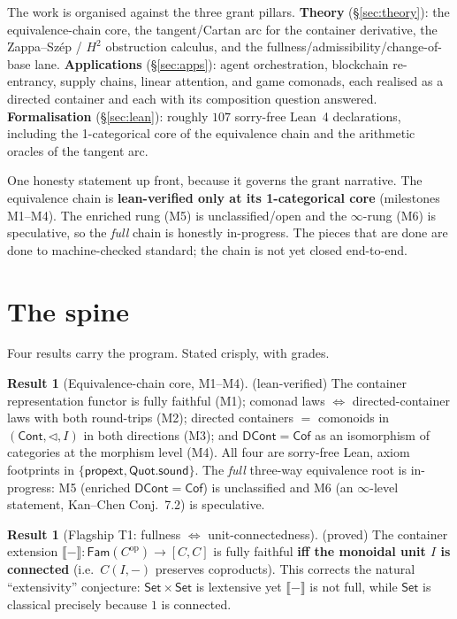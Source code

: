 \documentclass[11pt]{article}
\theoremstyle{definition}
\newtheorem{result}[theorem]{Result}
\newcommand{\Cont}{\mathsf{Cont}}
\newcommand{\DCont}{\mathsf{DCont}}
\newcommand{\Cof}{\mathsf{Cof}}
\newcommand{\Set}{\mathsf{Set}}
\newcommand{\Fam}{\mathsf{Fam}}
\newcommand{\sem}[1]{\llbracket #1 \rrbracket}
\newcommand{\grade}[1]{{\small\textsf{(#1)}}}
\begin{document}
The work is organised against the three grant pillars.
\textbf{Theory} (\S\ref{sec:theory}): the equivalence-chain core, the tangent/Cartan arc for
the container derivative, the Zappa--Szép / $H^2$ obstruction calculus, and the
fullness/admissibility/change-of-base lane. \textbf{Applications} (\S\ref{sec:apps}): agent
orchestration, blockchain re-entrancy, supply chains, linear attention, and game comonads, each
realised as a directed container and each with its composition question answered.
\textbf{Formalisation} (\S\ref{sec:lean}): roughly $107$ sorry-free Lean~4 declarations,
including the 1-categorical core of the equivalence chain and the arithmetic oracles of the
tangent arc.

One honesty statement up front, because it governs the grant narrative. The equivalence chain
is \textbf{lean-verified only at its 1-categorical core} (milestones M1--M4). The enriched rung
(M5) is unclassified/open and the $\infty$-rung (M6) is speculative, so the \emph{full} chain
is honestly \textsf{in-progress}. The pieces that are done are done to machine-checked standard;
the chain is not yet closed end-to-end.

\section{The spine}
\label{sec:spine}

Four results carry the program. Stated crisply, with grades.

\begin{result}[Equivalence-chain core, M1--M4]\grade{lean-verified}
\label{res:chain}
The container representation functor is fully faithful (M1); comonad laws $\Leftrightarrow$
directed-container laws with both round-trips (M2); directed containers $=$ comonoids in
$(\Cont,\lhd,I)$ in both directions (M3); and $\DCont = \Cof$ as an isomorphism of categories
at the morphism level (M4). All four are sorry-free Lean, axiom footprints in
$\{\textsf{propext},\textsf{Quot.sound}\}$. The \emph{full} three-way equivalence root is
\textsf{in-progress}: M5 (enriched $\DCont = \Cof$) is unclassified and M6 (an $\infty$-level
statement, Kan--Chen Conj.\ 7.2) is speculative.
\end{result}

\begin{result}[Flagship T1: fullness $\Leftrightarrow$ unit-connectedness]\grade{proved}
\label{res:t1}
The container extension $\sem{-}\colon \Fam(C^{\mathrm{op}}) \to [C,C]$ is fully faithful
\textbf{iff the monoidal unit $I$ is connected} (i.e.\ $C(I,-)$ preserves coproducts). This
corrects the natural ``extensivity'' conjecture: $\Set \times \Set$ is lextensive yet
$\sem{-}$ is not full, while $\Set$ is classical precisely because $1$ is connected.
\end{result}
\end{document}
